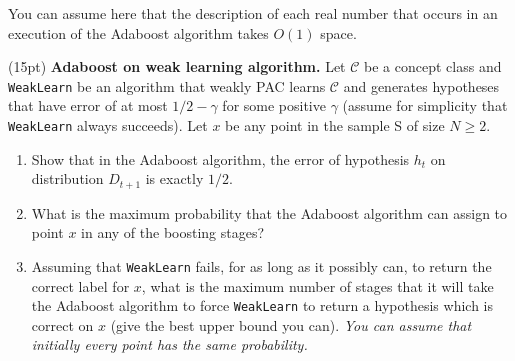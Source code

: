 \documentclass[11pt]{article}
\newcommand*{\C}{{\mathcal C}}
\DeclareMathOperator{\1}{\mathbbm{1}}
\begin{document}
\begin{hint}
    You can assume here that the description of each real number that occurs in an execution of the Adaboost algorithm takes $O(1)$ space.
\end{hint}




\begin{problem}(15pt) \textbf{Adaboost on weak learning algorithm.}  
Let $\C$ be a concept class and {\tt WeakLearn} be an algorithm that weakly PAC
learns $\C$ and generates hypotheses that have error of at most $1/2-\gamma$
for some positive $\gamma$ (assume for simplicity that {\tt WeakLearn} always
succeeds). Let $x$ be any point in the sample S of size $N \geq 2$.
\begin{enumerate}
\item Show that in the Adaboost algorithm, the error of hypothesis $h_t$ on
distribution $D_{t+1}$ is exactly $1/2.$
\item What is the maximum probability that the Adaboost algorithm can assign to
point $x$ in any of the boosting stages?
\item Assuming  that {\tt WeakLearn} fails, for as long as it possibly can, to
return the correct label for $x$, what is the maximum number of stages that it
will take the Adaboost algorithm to force  {\tt WeakLearn} to return a
hypothesis which is correct on $x$ (give the best upper bound you can). {\em You
can assume that initially every point has the same probability.}
\end{enumerate}
\end{problem}
\end{document}
